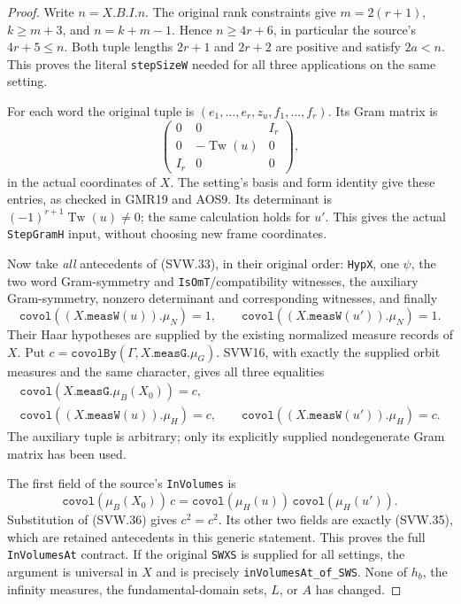 \begin{proof}
Write $n=X.B.I.n$.  The original rank constraints give
$m=2(r+1)$, $k\geq m+3$, and $n=k+m-1$.  Hence
$n\geq4r+6$, in particular the source's $4r+5\leq n$.
Both tuple lengths $2r+1$ and $2r+2$ are positive and satisfy
$2a<n$.  This proves the literal \texttt{stepSizeW} needed for
all three applications on the same setting.

For each word the original tuple is
$(e_1,\ldots,e_r,z_u,f_1,\ldots,f_r)$.  Its Gram matrix is
\[
 \begin{pmatrix}
   0&0&I_r\\0&-\operatorname{Tw}(u)&0\\I_r&0&0
 \end{pmatrix},
 \tag{SVW.34}
\]
in the actual coordinates of $X$.  The setting's basis and form
identity give these entries, as checked in GMR19 and AOS9.  Its
determinant is $(-1)^{r+1}\operatorname{Tw}(u)\ne0$; the same
calculation holds for $u'$.  This gives the actual
\texttt{StepGramH} input, without choosing new frame coordinates.

Now take \emph{all} antecedents of (SVW.33), in their original
order: \texttt{HypX}, one $\psi$, the two word Gram-symmetry and
\texttt{IsOmT}/compatibility witnesses, the auxiliary Gram-symmetry,
nonzero determinant and corresponding witnesses, and finally
\[
 \texttt{covol}((X.\texttt{measW}(u)).\mu_N)=1,
 \qquad
 \texttt{covol}((X.\texttt{measW}(u')).\mu_N)=1.
 \tag{SVW.35}
\]
Their Haar hypotheses are supplied by the existing normalized
measure records of $X$.  Put
$c=\texttt{covolBy}(\Gamma,X.\texttt{measG}.\mu_G)$.
SVW16, with exactly the supplied orbit measures and the same
character, gives all three equalities
\[
 \begin{gathered}
 \texttt{covol}(X.\texttt{measG}.\mu_B(X_0))=c,\\
 \texttt{covol}((X.\texttt{measW}(u)).\mu_H)=c,
 \qquad
 \texttt{covol}((X.\texttt{measW}(u')).\mu_H)=c.
 \end{gathered}
 \tag{SVW.36}
\]
The auxiliary tuple is arbitrary; only its explicitly supplied
nondegenerate Gram matrix has been used.

The first field of the source's \texttt{InVolumes} is
\[
 \texttt{covol}(\mu_B(X_0))\,c
       =\texttt{covol}(\mu_H(u))\,
                               \texttt{covol}(\mu_H(u')).
 \tag{SVW.37}
\]
Substitution of (SVW.36) gives $c^2=c^2$.  Its other two fields
are exactly (SVW.35), which are retained antecedents in this
generic statement.  This proves the full \texttt{InVolumesAt}
contract.  If the original \texttt{SWXS} is supplied for all
settings, the argument is universal in $X$ and is precisely
\texttt{inVolumesAt\_of\_SWS}.  None of $h_b$, the infinity
measures, the fundamental-domain sets, $L$, or $A$ has changed.
\end{proof}

